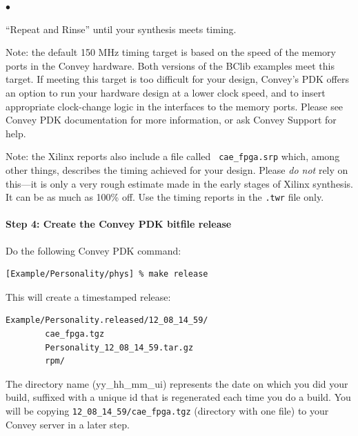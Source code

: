 \documentclass[twoside,letterpaper,11pt]{article}
\newcommand{\hm}{\hspace*{1em}}
\newlength{\hlessmm}
\newlength{\hlessmmmm}
\newenvironment{tightlist}%
{\begin{list}{$\bullet$}{%
    \setlength{\topsep}{0in}
    \setlength{\partopsep}{0in}
    \setlength{\itemsep}{0in}
    \setlength{\parsep}{0in}
    \setlength{\leftmargin}{1.5em}
    \setlength{\rightmargin}{0in}
    \setlength{\itemindent}{0in}
}
}%
{\end{list}
}
\begin{document}
{\begin{minipage}{\hlessmmmm}
\begin{tightlist}
\item ``Repeat and Rinse'' until your synthesis meets timing.

\end{tightlist}

\vspace*{1ex}

Note: the default 150 MHz timing target is based on the speed of the
memory ports in the Convey hardware.  Both versions of the BClib
examples meet this target.  If meeting this target is too difficult
for your design, Convey's PDK offers an option to run your hardware
design at a lower clock speed, and to insert appropriate clock-change
logic in the interfaces to the memory ports.  Please see Convey PDK
documentation for more information, or ask Convey Support for help.

\vspace*{1ex}

Note: the Xilinx reports also include a file called {\tt
cae\_fpga.srp} which, among other things, describes the timing
achieved for your design.  Please \emph{do not} rely on this---it is
only a very rough estimate made in the early stages of Xilinx
synthesis.  It can be as much as 100\% off.  Use the timing reports
in the {\tt .twr} file only.

\end{minipage}}


\paragraph{Step 4: Create the Convey PDK bitfile release}
\hm

Do the following Convey PDK command:
\begin{Verbatim}[frame=single, label=Creating the PDK bitfile release]
[Example/Personality/phys] % make release
\end{Verbatim}
This will create a timestamped release:
\begin{Verbatim}[frame=single, label=The timestamped bitfile release]
    Example/Personality.released/12_08_14_59/
        cae_fpga.tgz
        Personality_12_08_14_59.tar.gz
        rpm/
\end{Verbatim}

The directory name (yy\_hh\_mm\_ui) represents the date on which you
did your build, suffixed with a unique id that is regenerated each
time you do a build. You will be copying
\verb|12_08_14_59/cae_fpga.tgz| (directory with one file) to your
Convey server in a later step.
\end{document}
